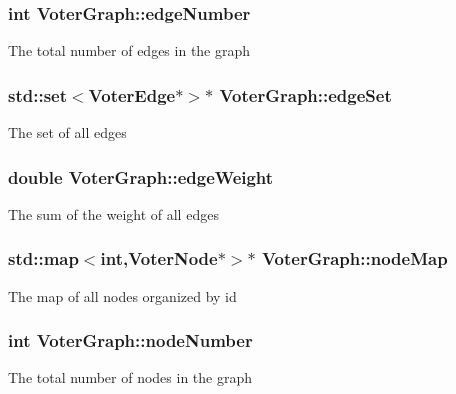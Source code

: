 \subsubsection[{edge\+Number}]{\setlength{\rightskip}{0pt plus 5cm}int Voter\+Graph\+::edge\+Number}\label{class_voter_graph_a6840594abf9c606b4ac8c7cac88cdf9b}
The total number of edges in the graph \hypertarget{class_voter_graph_a712b0ec4b780579721b7b6bca8fd409e}{}
\subsubsection[{edge\+Set}]{\setlength{\rightskip}{0pt plus 5cm}std\+::set$<${\bf Voter\+Edge}$\ast$$>$$\ast$ Voter\+Graph\+::edge\+Set}\label{class_voter_graph_a712b0ec4b780579721b7b6bca8fd409e}
The set of all edges \hypertarget{class_voter_graph_a33dc5727bd80818f0d4e89c17303d7c8}{}
\subsubsection[{edge\+Weight}]{\setlength{\rightskip}{0pt plus 5cm}double Voter\+Graph\+::edge\+Weight}\label{class_voter_graph_a33dc5727bd80818f0d4e89c17303d7c8}
The sum of the weight of all edges \hypertarget{class_voter_graph_a73838569fae5c5c96efadb1f121f5a90}{}
\subsubsection[{node\+Map}]{\setlength{\rightskip}{0pt plus 5cm}std\+::map$<$int,{\bf Voter\+Node}$\ast$$>$$\ast$ Voter\+Graph\+::node\+Map}\label{class_voter_graph_a73838569fae5c5c96efadb1f121f5a90}
The map of all nodes organized by id \hypertarget{class_voter_graph_a7557cf918e298cf5d5558f7323fe8f35}{}
\subsubsection[{node\+Number}]{\setlength{\rightskip}{0pt plus 5cm}int Voter\+Graph\+::node\+Number}\label{class_voter_graph_a7557cf918e298cf5d5558f7323fe8f35}
The total number of nodes in the graph \hypertarget{class_voter_graph_ab4c1bdbd12ebccd735841471984dfeec}{}
